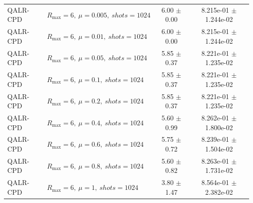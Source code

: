 \begin{table}[t]
\begin{tabular}{@{}llcc@{}}
QALR-CPD & \(R_{\max}=6,\ \mu=0.005,\ shots=1024\) & 6.00 $\pm$ 0.00 & 8.215e-01 $\pm$ 1.244e-02 \\
QALR-CPD & \(R_{\max}=6,\ \mu=0.01,\ shots=1024\) & 6.00 $\pm$ 0.00 & 8.215e-01 $\pm$ 1.244e-02 \\
QALR-CPD & \(R_{\max}=6,\ \mu=0.05,\ shots=1024\) & 5.85 $\pm$ 0.37 & 8.221e-01 $\pm$ 1.235e-02 \\
QALR-CPD & \(R_{\max}=6,\ \mu=0.1,\ shots=1024\) & 5.85 $\pm$ 0.37 & 8.221e-01 $\pm$ 1.235e-02 \\
QALR-CPD & \(R_{\max}=6,\ \mu=0.2,\ shots=1024\) & 5.85 $\pm$ 0.37 & 8.221e-01 $\pm$ 1.235e-02 \\
QALR-CPD & \(R_{\max}=6,\ \mu=0.4,\ shots=1024\) & 5.60 $\pm$ 0.99 & 8.262e-01 $\pm$ 1.800e-02 \\
QALR-CPD & \(R_{\max}=6,\ \mu=0.6,\ shots=1024\) & 5.75 $\pm$ 0.72 & 8.239e-01 $\pm$ 1.504e-02 \\
QALR-CPD & \(R_{\max}=6,\ \mu=0.8,\ shots=1024\) & 5.60 $\pm$ 0.82 & 8.263e-01 $\pm$ 1.731e-02 \\
QALR-CPD & \(R_{\max}=6,\ \mu=1,\ shots=1024\) & 3.80 $\pm$ 1.47 & 8.564e-01 $\pm$ 2.382e-02 \\
\bottomrule
\end{tabular}
\end{table}